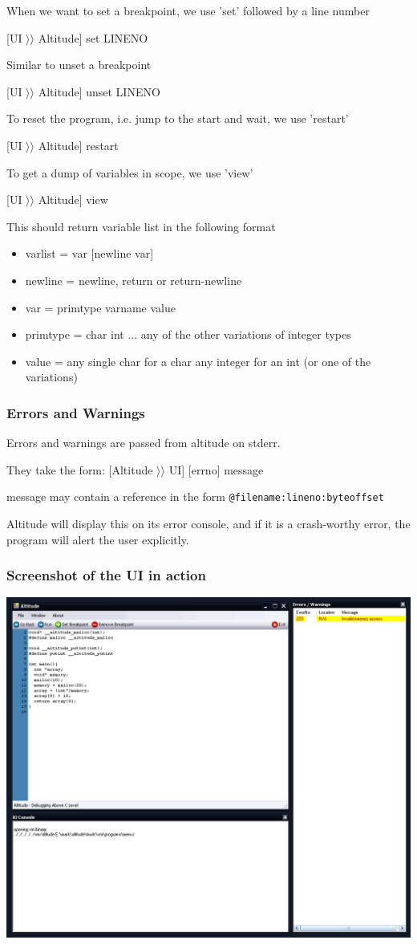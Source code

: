 \documentclass[10pt,a4paper]{report}
\begin{document}
When we want to set a breakpoint, we use 'set' followed by a line number

[UI $\rangle\rangle$ Altitude] set LINENO

Similar to unset a breakpoint

[UI $\rangle\rangle$ Altitude] unset LINENO

To reset the program, i.e. jump to the start and wait, we use 'restart'

[UI $\rangle\rangle$ Altitude] restart

To get a dump of variables in scope, we use 'view'

[UI $\rangle\rangle$ Altitude] view

This should return variable list in the following format
\begin{itemize}
\item varlist = var [newline var]
\item newline = newline, return or return-newline
\item var = primtype varname value
\item primtype = char  int ... any of the other variations of integer types
\item value = any single char for a char  any integer for an int (or one of the variations)
\end{itemize}

\subsubsection{Errors and Warnings}

Errors and warnings are passed from altitude on stderr.

They take the form:
[Altitude $\rangle\rangle$ UI] [errno] message

message may contain a reference in the form \lstinline{@filename:lineno:byteoffset}


Altitude will display this on its error console, and if it is a crash-worthy error, the program will alert the user explicitly.

\subsubsection{Screenshot of the UI in action}
\includegraphics[scale=0.35]{gui_screenshot.png}
\end{document}
